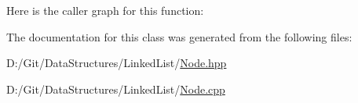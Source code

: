 Here is the caller graph for this function\+:


The documentation for this class was generated from the following files\+:\begin{DoxyCompactItemize}
\item 
D\+:/\+Git/\+Data\+Structures/\+Linked\+List/\hyperlink{_node_8hpp}{Node.\+hpp}\item 
D\+:/\+Git/\+Data\+Structures/\+Linked\+List/\hyperlink{_node_8cpp}{Node.\+cpp}\end{DoxyCompactItemize}
